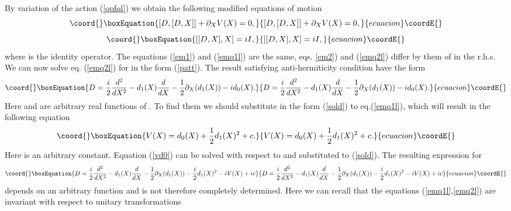 \documentclass[a4paper,11pt]{article}
\begin{document}
By variation of the action (\ref{opfql}) we obtain the following
modified equations of motion
\begin{equation}\coord{}\boxEquation{
[D,[D,X]] + \partial_X V(X)=0, \label{emq1l}
}{
[D,[D,X]] + \partial_X V(X)=0, }{ecuacion}\coordE{}\end{equation}
\begin{equation}\coord{}\boxEquation{
[[D,X],X]=iI, \label{emq2l}
}{
[[D,X],X]=iI, }{ecuacion}\coordE{}\end{equation}
where \coordHE{} is the identity operator. The equations (\ref{em1}) and
(\ref{emq1l}) are the same, eqs. \ref{em2}) and (\ref{emq2l})
differ by them of \coordHE{} in the r.h.s. We can now solve eq.
(\ref{emq2l}) for \coordHE{} in the form (\ref{patt}). The result
satisfying anti-hermiticity condition have the form
\begin{equation}\coord{}\boxEquation{
D=\frac{i}{2}\frac{d^2}{dX^2}-d_1(X)\frac{d}{dX}-\frac{1}{2}\partial_X
(d_1(X))-i d_0(X). \label{sold}
}{
D=\frac{i}{2}\frac{d^2}{dX^2}-d_1(X)\frac{d}{dX}-\frac{1}{2}\partial_X
(d_1(X))-i d_0(X). }{ecuacion}\coordE{}\end{equation}
Here \coordHE{} and \coordHE{} are arbitrary real functions of \coordHE{}. To find
them we should substitute \coordHE{} in the form (\ref{sold}) to
eq.(\ref{emq1l}), which will result in the following equation
\begin{equation}\coord{}\boxEquation{
V(X)=d_0(X)+\frac{1}{2}d_1(X)^2+c. \label{vd0}
}{
V(X)=d_0(X)+\frac{1}{2}d_1(X)^2+c. }{ecuacion}\coordE{}\end{equation}
Here \coordHE{} is an arbitrary constant. Equation (\ref{vd0}) can be
solved with respect to \coordHE{} and substituted to (\ref{sold}). The
resulting expression for \coordHE{}
\begin{equation}\coord{}\boxEquation{
D=\frac{i}{2}\frac{d^2}{dX^2}-d_1(X)\frac{d}{dX}-\frac{1}{2}\partial_X
(d_1(X))-\frac{i}{2}d_1(X)^2- i V(X)+ic \label{sold1}
}{
D=\frac{i}{2}\frac{d^2}{dX^2}-d_1(X)\frac{d}{dX}-\frac{1}{2}\partial_X
(d_1(X))-\frac{i}{2}d_1(X)^2- i V(X)+ic }{ecuacion}\coordE{}\end{equation}
depends on an arbitrary function \coordHE{} and is not therefore
completely determined. Here we can recall that the equations
(\ref{emq1l},\ref{emq2l}) are invariant with respect to unitary
transformations
\end{document}
